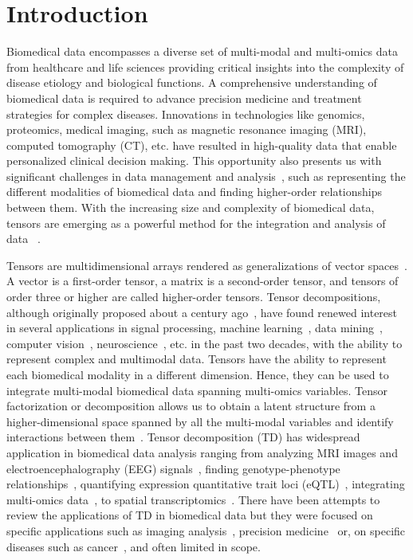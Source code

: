 \section{Introduction} 

Biomedical data encompasses a diverse set of multi-modal and multi-omics data from healthcare and life sciences providing critical insights into the complexity of disease etiology and biological functions. A comprehensive understanding of biomedical data is required to advance precision medicine and treatment strategies for complex diseases. Innovations in technologies like genomics, proteomics, medical imaging, such as magnetic resonance imaging (MRI), computed tomography (CT), etc. have resulted in high-quality data that enable personalized clinical decision making. This opportunity also presents us with significant challenges in data management and analysis~\cite{lambin2017radiomics}, such as representing the different modalities of biomedical data and finding higher-order relationships between them. With the increasing size and complexity of biomedical data, tensors  are emerging as a powerful method for the integration and analysis of data ~\cite{ho2014marble,luo2017tensor,wang2021variational, jung2021monti, taguchi2022novel, gao2023biostd, liu2023multiomics, zhou2013tensor}.

Tensors are multidimensional arrays rendered as generalizations of vector spaces~\cite{kolda2009tensor}. A vector is a first-order tensor, a matrix is a second-order tensor, and tensors of order three or higher are called higher-order tensors. Tensor decompositions, although originally proposed about a century ago~\cite{hitchcock1927expression}, have found renewed interest in several applications in signal processing, machine learning~\cite{sidiropoulos2017tensor}, data mining~\cite{papalexakis2016tensors}, computer vision~\cite{shashua2005non}, neuroscience~\cite{beckmann2005tensorial}, etc. in the past two decades, with the ability to represent complex and multimodal data. Tensors have the ability to represent each biomedical modality in a different dimension. Hence, they can be used to integrate multi-modal biomedical data spanning multi-omics variables. Tensor factorization or decomposition allows us to obtain a latent structure from a higher-dimensional space spanned by all the multi-modal variables and identify interactions between them~\cite{kolda2009tensor, luo2017tensor}. Tensor decomposition (TD) has widespread application in biomedical data analysis ranging from analyzing MRI images and electroencephalography (EEG) signals~\cite{sedighin2024tensor}, finding genotype-phenotype relationships~\cite{kessler2014learning}, quantifying expression quantitative trait loci (eQTL)~\cite{hore2016tensor}, integrating multi-omics data~\cite{jung2021monti}, to spatial transcriptomics~\cite{broadbent2024deciphering}. There have been attempts to review the applications of TD in biomedical data but they were focused on specific applications such as imaging analysis~\cite{sedighin2024tensor}, precision medicine~\cite{luo2017tensor} or, on specific diseases such as cancer~\cite{movahed2024tensor}, and often limited in scope. 

